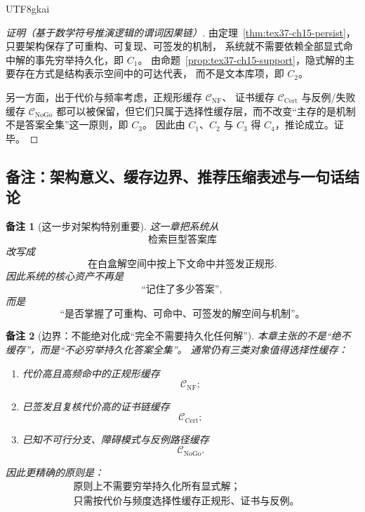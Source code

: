 \documentclass[12pt]{article}
\newtheorem{remark}{备注}[section]
\begin{document}
\begin{CJK*}{UTF8}{gkai}
\begin{proof}[证明（基于数学符号推演逻辑的谓词因果链）]
由定理~\ref{thm:tex37-ch15-persist}，只要架构保存了可重构、可复现、可签发的机制，
系统就不需要依赖全部显式命中解的事先穷举持久化，即 $C_1$。
由命题~\ref{prop:tex37-ch15-support}，隐式解的主要存在方式是结构表示空间中的可达代表，
而不是文本库项，即 $C_2$。

另一方面，出于代价与频率考虑，正规形缓存 $\mathcal C_{\mathrm{NF}}$、
证书缓存 $\mathcal C_{\mathrm{Cert}}$ 与反例/失败缓存 $\mathcal C_{\mathrm{NoGo}}$
都可以被保留，但它们只属于选择性缓存层，而不改变“主存的是机制不是答案全集”这一原则，即 $C_3$。
因此由 $C_1$、$C_2$ 与 $C_3$ 得 $C_4$，推论成立。证毕。
\end{proof}

\subsection{备注：架构意义、缓存边界、推荐压缩表述与一句话结论}
\label{subsec:tex37-ch15-remarks}

\begin{remark}[这一步对架构特别重要]
这一章把系统从
\[
  \text{检索巨型答案库}
\]
改写成
\[
  \text{在白盒解空间中按上下文命中并签发正规形}.
\]
因此系统的核心资产不再是
\[
  \text{“记住了多少答案”},
\]
而是
\[
  \boxed{
    \text{“是否掌握了可重构、可命中、可签发的解空间与机制”。}
  }
\]
\end{remark}

\begin{remark}[边界：不能绝对化成“完全不需要持久化任何解”]
本章主张的不是“绝不缓存”，而是“不必穷举持久化答案全集”。
通常仍有三类对象值得选择性缓存：
\begin{enumerate}
  \item 代价高且高频命中的正规形缓存
  \[
    \mathcal C_{\mathrm{NF}};
  \]
  \item 已签发且复核代价高的证书链缓存
  \[
    \mathcal C_{\mathrm{Cert}};
  \]
  \item 已知不可行分支、障碍模式与反例路径缓存
  \[
    \mathcal C_{\mathrm{NoGo}}.
  \]
\end{enumerate}
因此更精确的原则是：
\[
  \boxed{
    \begin{aligned}
      &\text{原则上不需要穷举持久化所有显式解；}\\
      &\text{只需按代价与频度选择性缓存正规形、证书与反例。}
    \end{aligned}
  }
\]
\end{remark}


\end{CJK*}
\end{document}
